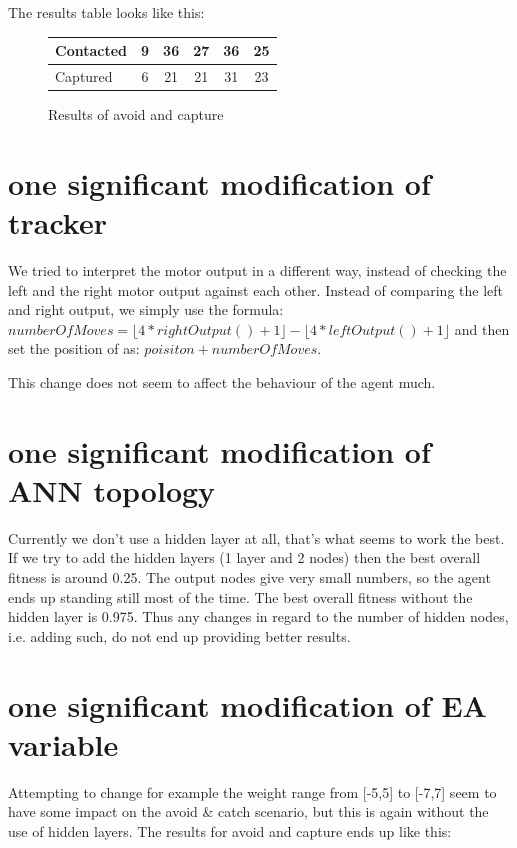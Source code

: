 \documentclass[12pt, a4paper]{article}
\begin{document}
The results table looks like this:

\begin{figure}[H]
	\begin{center}
		\begin{tabular}{l | c | c |c |c |c }
		 Contacted& 9 & 36 & 27 & 36 & 25\\ \hline
		 Captured & 6 & 21 & 21 & 31 & 23\\
		 
		\end{tabular}
	\end{center}
	\caption{Results of avoid and capture}
\end{figure}


\section{one significant modification of tracker}
We tried to interpret the motor output in a different way, instead of checking the left and the right motor output against each other. Instead of comparing the left and right output, we simply use the formula:\\ $numberOfMoves = \lfloor 4*rightOutput()+1 \rfloor - \lfloor 4*leftOutput()+1 \rfloor$
and then set the position of as: $ poisiton + numberOfMoves $.

This change does not seem to affect the behaviour of the agent much.

\section{one significant modification of ANN topology}
Currently we don't use a hidden layer at all, that's what seems to work the best. If we try to add the hidden layers (1 layer and 2 nodes) then the best overall fitness is around 0.25. The output nodes give very small numbers, so the agent ends up standing still most of the time. The best overall fitness without the hidden layer is 0.975. Thus any changes in regard to the number of hidden nodes, i.e. adding such, do not end up providing better results.

\section{one significant modification of EA variable}
Attempting to change for example the weight range from [-5,5] to [-7,7] seem to have some impact on the avoid \& catch scenario, but this is again without the use of hidden layers. The results for avoid and capture ends up like this:
\end{document}
